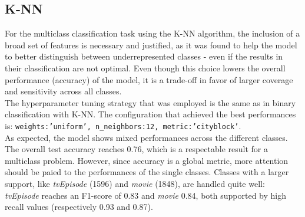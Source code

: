 \subsection{K-NN}
For the multiclass classification task using the K-NN algorithm, the inclusion of a broad set of 
features is necessary and justified, as it was found to help the model to better distinguish between 
underrepresented classes - even if the results in their classification are not optimal. 
Even though this choice lowers the overall performance (accuracy) of the model, 
it is a trade-off in favor of larger coverage and sensitivity across all classes.\\
The hyperparameter tuning strategy that was employed is the same as in binary classification with K-NN. 
The configuration that achieved the best performances is: \texttt{{weights:'uniform', n\_neighbors:12, metric:'cityblock'}}.\\ 
As expected, the model shows mixed performances across the different classes. 
The overall test accuracy reaches 0.76, which is a respectable result for a multiclass problem. 
However, since accuracy is a global metric, more attention should be paied to the performances of the single classes. 
Classes with a larger support, like \textit{tvEpisode} (1596) and \textit{movie} (1848), are handled quite well: \textit{tvEpisode} reaches an F1-score of 0.83 and \textit{movie} 0.84, both supported by high recall values (respectively 0.93 and 0.87). 
